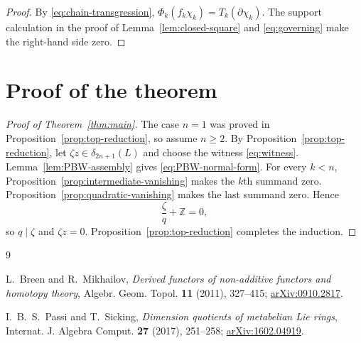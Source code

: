 \documentclass[11pt]{amsart}
\theoremstyle{remark}
\newcommand{\Z}{\mathbb Z}
\begin{document}
\begin{proof}
By \eqref{eq:chain-transgression},
$\Phi_k(f_k\chi_k)=T_k(\partial\chi_k)$.  The support calculation in
the proof of Lemma~\ref{lem:closed-square} and
\eqref{eq:governing} make the right-hand side zero.
\end{proof}

\section{Proof of the theorem}

\begin{proof}[Proof of Theorem~\ref{thm:main}]
The case $n=1$ was proved in Proposition~\ref{prop:top-reduction}, so
assume $n\geq2$.
By Proposition~\ref{prop:top-reduction}, let
$\zeta z\in\delta_{2n+1}(L)$ and choose the witness
\eqref{eq:witness}.  Lemma~\ref{lem:PBW-assembly} gives
\eqref{eq:PBW-normal-form}.  For every $k<n$,
Proposition~\ref{prop:intermediate-vanishing} makes the $k$th summand zero.
Proposition~\ref{prop:quadratic-vanishing} makes the last summand zero.
Hence
\[
                         \frac\zeta q+\Z=0,
\]
so $q\mid\zeta$ and $\zeta z=0$.
Proposition~\ref{prop:top-reduction} completes the induction.
\end{proof}

\begin{thebibliography}{9}

L.~Breen and R.~Mikhailov,
\emph{Derived functors of non-additive functors and homotopy theory},
Algebr. Geom. Topol. \textbf{11} (2011), 327--415;
\href{https://arxiv.org/abs/0910.2817}{arXiv:0910.2817}.

I.~B.~S.~Passi and T.~Sicking,
\emph{Dimension quotients of metabelian Lie rings},
Internat. J. Algebra Comput. \textbf{27} (2017), 251--258;
\href{https://arxiv.org/abs/1602.04919}{arXiv:1602.04919}.

\end{thebibliography}
\end{document}
